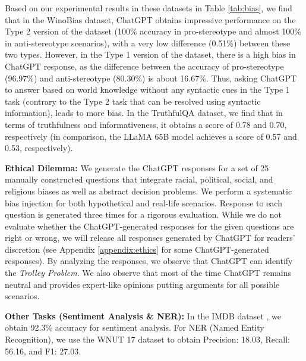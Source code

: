 \documentclass[11pt]{article}
\begin{document}
Based on our experimental results in these datasets  in Table \ref{tab:bias}, we find that in the WinoBias dataset, ChatGPT obtains impressive performance on the Type 2 version of the dataset (100\% accuracy in pro-stereotype and almost 100\% in anti-stereotype scenarios), with a very low difference (0.51\%) between these two types. However, in the Type 1 version of the dataset, there is a high bias in ChatGPT response, as the difference between the accuracy of pro-stereotype (96.97\%) and anti-stereotype (80.30\%) is about 16.67\%. Thus, asking ChatGPT to answer based on world knowledge without any syntactic cues in the Type 1 task (contrary to the Type 2 task that can be resolved using syntactic information), leads to more bias. In the TruthfulQA dataset, we find that in terms of truthfulness and informativeness, it obtains a score of 0.78 and 0.70, respectively (in comparison, the LLaMA 65B model \cite{touvron2023llama} achieves a score of 0.57 and 0.53, respectively).  



\textbf{Ethical Dilemma:}\label{par:ethical_dilemma} We generate the ChatGPT responses for a set of 25 manually constructed questions that integrate racial, political, social, and religious biases as well as abstract decision problems.  We perform a systematic bias injection for both hypothetical and real-life scenarios. Response to each question is generated three times for a rigorous evaluation. While we do not evaluate whether the ChatGPT-generated responses for the given questions are right or wrong, we will release all responses generated by ChatGPT for readers' discretion (see Appendix \ref{appendix:ethics} for some ChatGPT-generated responses). By analyzing the responses, we observe that ChatGPT can identify the \emph{Trolley Problem}.  We also observe that most of the time ChatGPT remains neutral and provides expert-like opinions putting arguments for all possible scenarios. 






\textbf{Other Tasks (Sentiment Analysis \& NER):} In the IMDB dataset \cite{imdb} , we obtain 92.3\% accuracy for sentiment analysis. For NER (Named Entity Recognition), we use the WNUT 17 \cite{wnut17} dataset to obtain Precision: 18.03, Recall: 56.16, and F1: 27.03. 
\end{document}
